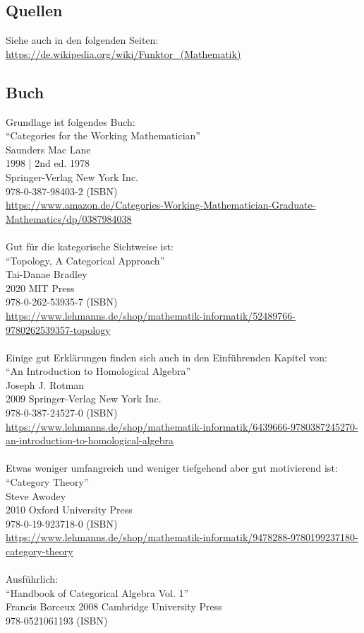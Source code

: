 \documentclass[a4paper]{amsart}
\theoremstyle{definition}
\begin{document}
\subsection*{Quellen}
Siehe auch in den folgenden Seiten:\\
\url{https://de.wikipedia.org/wiki/Funktor_(Mathematik)}

\subsection*{Buch}
Grundlage ist folgendes Buch:\\
"`Categories for the Working Mathematician"'\\
Saunders Mac Lane\\
1998 | 2nd ed. 1978\\
Springer-Verlag New York Inc.\\
978-0-387-98403-2 (ISBN)\\
{\tiny
   \url{https://www.amazon.de/Categories-Working-Mathematician-Graduate-Mathematics/dp/0387984038}}\\
\\
Gut für die kategorische Sichtweise ist:\\
"`Topology, A Categorical Approach"'\\
Tai-Danae Bradley\\
2020 MIT Press\\
978-0-262-53935-7 (ISBN)\\
{\tiny
\url{https://www.lehmanns.de/shop/mathematik-informatik/52489766-9780262539357-topology}}\\
\\
Einige gut Erklärungen finden sich auch in den Einführenden Kapitel von:\\
"`An Introduction to Homological Algebra"'\\
Joseph J. Rotman\\
2009 Springer-Verlag New York Inc.\\
978-0-387-24527-0 (ISBN)\\
{\tiny \url{https://www.lehmanns.de/shop/mathematik-informatik/6439666-9780387245270-an-introduction-to-homological-algebra}}\\
\\
Etwas weniger umfangreich und weniger tiefgehend aber gut motivierend ist:\\
"`Category Theory"'\\
Steve Awodey\\
2010 Oxford University Press\\
978-0-19-923718-0 (ISBN)\\
{\tiny\url{https://www.lehmanns.de/shop/mathematik-informatik/9478288-9780199237180-category-theory}}\\
\\
Ausführlich:\\
"`Handbook of Categorical Algebra Vol. 1"'\\
Francis Borceux
2008 Cambridge University Press\\
978-0521061193 (ISBN)
\end{document}
